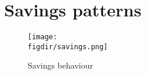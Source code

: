 
\section{Savings patterns}%
\label{sec:savings_patterns}

\begin{figure}[H]
    \center \newcommand\width{\textwidth} \caption{Savings behaviour}
    \label{fig:savings}
    \texttt{[image: \\figdir/savings.png]}
\end{figure}

